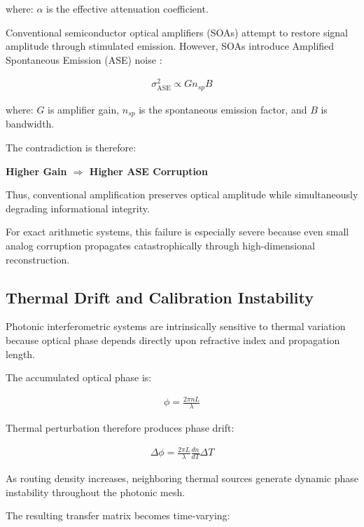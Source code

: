 \documentclass[journal]{IEEEtran}
\begin{document}
where: $\alpha$ is the effective attenuation coefficient.

Conventional semiconductor optical amplifiers (SOAs) attempt to restore signal amplitude through stimulated emission. However, SOAs introduce Amplified Spontaneous Emission (ASE) noise \cite{Winzer2006,Saleh2019}:

\begin{align}
\sigma^2_{\mathrm{ASE}} \propto Gn_{sp}B
\label{eq:ase_noise}
\end{align}

where: $G$ is amplifier gain, $n_{sp}$ is the spontaneous emission factor, and $B$ is bandwidth.

The contradiction is therefore:

\textbf{Higher Gain $\Longrightarrow$ Higher ASE Corruption}

Thus, conventional amplification preserves optical amplitude while simultaneously degrading informational integrity.

For exact arithmetic systems, this failure is especially severe because even small analog corruption propagates catastrophically through high-dimensional reconstruction.

\subsection{\textbf{Thermal Drift and Calibration Instability}}
\label{sec:thermal_drift}

Photonic interferometric systems are intrinsically sensitive to thermal variation because optical phase depends directly upon refractive index and propagation length.

The accumulated optical phase is:

\begin{align}
\phi = \frac{2\pi nL}{\lambda}
\label{eq:phase_equation}
\end{align}

Thermal perturbation therefore produces phase drift:

\begin{align}
\Delta \phi = \frac{2\pi L}{\lambda} \frac{dn}{dT} \Delta T
\label{eq:phase_drift}
\end{align}

As routing density increases, neighboring thermal sources generate dynamic phase instability throughout the photonic mesh.

The resulting transfer matrix becomes time-varying:
\end{document}

